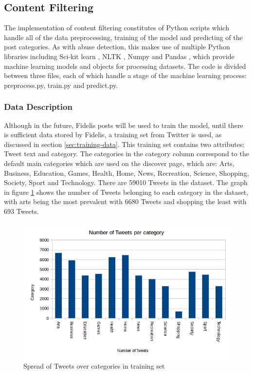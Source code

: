 \subsection{Content Filtering}
The implementation of content filtering constitutes of Python scripts which handle all of the data preprocessing, training of the model and predicting of the post categories. As with abuse detection, this makes use of multiple Python libraries including Sci-kit learn \cite{scikit:home}, NLTK \cite{nltk}, Numpy \cite{Numpy} and Pandas \cite{Pandas}, which provide machine learning models and objects for processing datasets. The code is divided between three files, each of which handle a stage of the machine learning process: preprocess.py, train.py and predict.py.

\subsubsection{Data Description}
Although in the future, Fidelis posts will be used to train the model, until there is sufficient data stored by Fidelis, a training set from Twitter is used, as discussed in section \ref{sec:training-data}. This training set contains two attributes: Tweet text and category. The categories in the category column correspond to the default main categories which are used on the discover page, which are: Arts, Business, Education, Games, Health, Home, News, Recreation, Science, Shopping, Society, Sport and Technology. There are 59010 Tweets in the dataset. The graph in figure \ref{fig:category-spread} shows the number of Tweets belonging to each category in the dataset, with arts being the most prevalent with 6680 Tweets and shopping the least with 693 Tweets.

\begin{figure}[H]
\centering
\includegraphics[width=\textwidth]{Images/Implementation/category-spread}
\caption{Spread of Tweets over categories in training set}
\label{fig:category-spread}
\end{figure}

